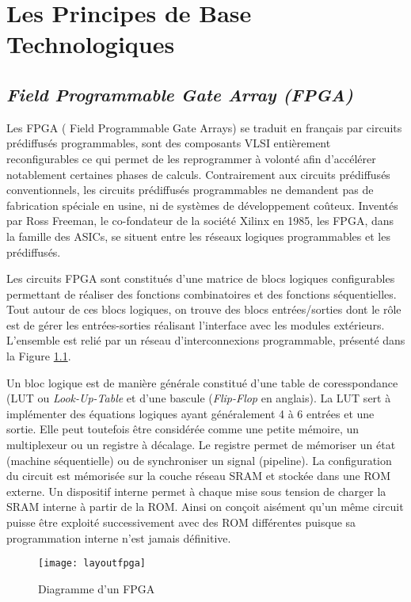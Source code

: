 \chapter{Les Principes de Base Technologiques}
\label{chap:principe}
\OnehalfSpacing
\section{\emph{Field Programmable Gate Array (FPGA)}}
\label{sec:fpga}
\justify
Les FPGA ( Field Programmable Gate Arrays) se traduit en français par circuits prédiffusés 
programmables\cite{hubinweb},
sont des composants VLSI  entièrement reconfigurables ce qui permet 
de les reprogrammer à volonté afin d'accélérer notablement certaines 
phases de calculs\cite{fpgaweb}. Contrairement aux circuits prédiffusés conventionnels, les circuits
prédiffusés programmables ne demandent pas de fabrication spéciale en usine, ni de systèmes de 
développement coûteux. Inventés par Ross Freeman, le co-fondateur de la société Xilinx en 1985, les FPGA, dans la famille
des ASICs, se situent entre les réseaux logiques programmables et les prédiffusés. 

Les circuits FPGA sont constitués d'une matrice de blocs logiques configurables permettant de réaliser des fonctions
combinatoires et des fonctions séquentielles. Tout autour de ces blocs logiques, on trouve des blocs entrées/sorties
dont le rôle est de gérer les entrées-sorties réalisant l'interface avec les modules extérieurs.
L'ensemble est relié par un réseau d'interconnexions programmable, présenté dans la Figure \ref{fig:layoutfpga}. 

Un bloc logique est de manière générale constitué d'une table de coresspondance
(LUT ou \emph{Look-Up-Table} et d'une bascule (\emph{Flip-Flop} en anglais). 
La LUT sert à implémenter
des équations logiques ayant généralement 4 à 6 entrées et une sortie. 
Elle peut toutefois être considérée comme une petite
mémoire, un multiplexeur ou un registre à décalage. 
Le registre permet de mémoriser un état (machine séquentielle) ou
de synchroniser un signal (pipeline).
La configuration du circuit est mémorisée sur la couche réseau SRAM et stockée dans une ROM externe. 
Un dispositif interne permet à chaque mise sous tension de charger la SRAM interne à partir de la ROM. 
Ainsi on conçoit aisément qu'un même circuit puisse être exploité successivement avec des ROM 
différentes puisque sa programmation interne n'est jamais définitive.

\begin{figure}[h]
	\centering
	\texttt{[image: layoutfpga]}
	\caption{Diagramme d'un FPGA\cite{fpgaprototype}}
	\label{fig:layoutfpga}
	\vspace{-2mm}
\end{figure}

